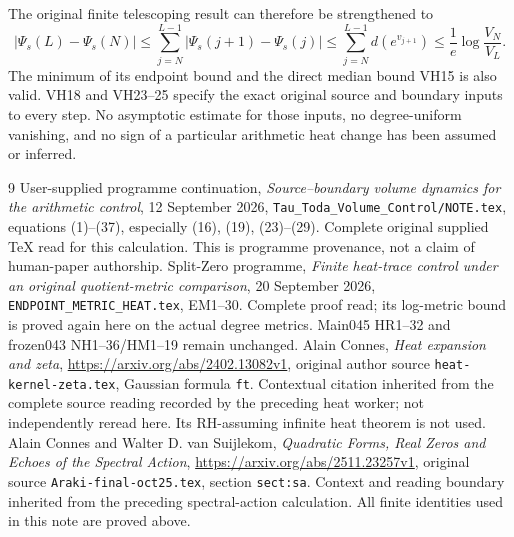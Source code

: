 \documentclass[11pt]{article}
\begin{document}
The original finite telescoping result can therefore be strengthened to
\begin{equation}\tag{VH31}\label{VH31}
|\Psi_s(L)-\Psi_s(N)|\le
\sum_{j=N}^{L-1}|\Psi_s(j+1)-\Psi_s(j)|
\le\sum_{j=N}^{L-1}d(e^{v_{j+1}})
\le\frac1e\log\frac{V_N}{V_L}.
\end{equation}
The minimum of its endpoint bound and the direct median bound VH15 is
also valid. VH18 and VH23--25 specify the exact original source and
boundary inputs to every step. No asymptotic estimate for those inputs,
no degree-uniform vanishing, and no sign of a particular arithmetic
heat change has been assumed or inferred.

\begin{thebibliography}{9}
 User-supplied programme continuation,
\emph{Source--boundary volume dynamics for the arithmetic control},
12 September 2026, \texttt{Tau\_Toda\_Volume\_Control/NOTE.tex},
equations (1)--(37), especially (16), (19), (23)--(29).
Complete original supplied TeX read for this calculation. This is
programme provenance, not a claim of human-paper authorship.
 Split-Zero programme,
\emph{Finite heat-trace control under an original quotient-metric comparison},
20 September 2026, \texttt{ENDPOINT\_METRIC\_HEAT.tex}, EM1--30.
Complete proof read; its log-metric bound is proved again here on the
actual degree metrics. Main045 HR1--32 and frozen043 NH1--36/HM1--19
remain unchanged.
 Alain Connes, \emph{Heat expansion and zeta},
\url{https://arxiv.org/abs/2402.13082v1}, original author source
\texttt{heat-kernel-zeta.tex}, Gaussian formula \texttt{ft}.
Contextual citation inherited from the complete source reading recorded
by the preceding heat worker; not independently reread here. Its
RH-assuming infinite heat theorem is not used.
 Alain Connes and Walter D. van Suijlekom,
\emph{Quadratic Forms, Real Zeros and Echoes of the Spectral Action},
\url{https://arxiv.org/abs/2511.23257v1}, original source
\texttt{Araki-final-oct25.tex}, section \texttt{sect:sa}.
Context and reading boundary inherited from the preceding spectral-action
calculation. All finite identities used in this note are proved above.
\end{thebibliography}
\end{document}
